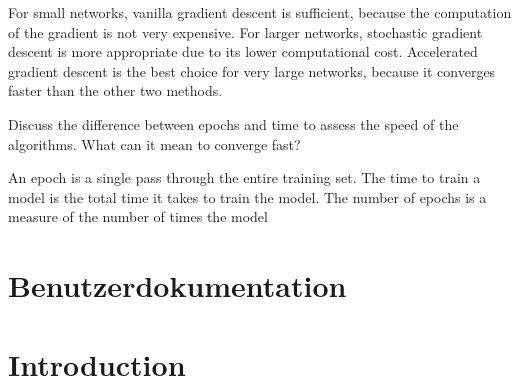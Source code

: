 \documentclass{article}
\newenvironment{task}[1]{
  \begin{tcolorbox}[
    colback=highlight!5!white,
    colframe=highlight,
    title={Task #1}
  ]
}{
  \end{tcolorbox}
}
\begin{document}
For small networks, vanilla gradient descent is sufficient, because the computation of the gradient
is not very expensive. For larger networks, stochastic gradient descent is more appropriate due to
its lower computational cost. Accelerated gradient descent is the best choice for very large
networks, because it converges faster than the other two methods.


\begin{task}{1.3.4}
  Discuss the difference between epochs and time to assess the speed of the algorithms. What can it
  mean to converge fast?
\end{task}

An epoch is a single pass through the entire training set. The time to train a model is the total
time it takes to train the model. The number of epochs is a measure of the number of times the model







\cite{Ries1522Rad}

\newpage
\nocite{}





\appendix

\section{Benutzerdokumentation}
\label{app1}
\section{Introduction}
\end{document}
